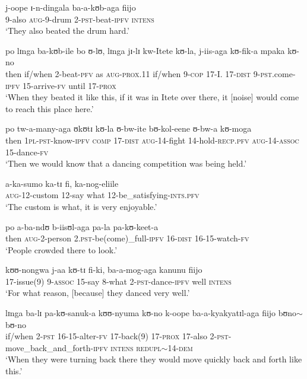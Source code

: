 \begin{exe}
\ex \gll j-oope ɪ-n-dingala ba-a-kʊb-aga fiijo\\
9-also \textsc{aug}-9-drum 2-\textsc{pst}-beat-\textsc{ipfv} \textsc{intens}\\
\glt \lq They also beated the drum hard.'

\ex \gll po lɪnga ba-kʊb-ile bo ʊ-lʊ, lɪnga jɪ-lɪ kw-Itete kʊ-la, j-iis-aga kʊ-fik-a mpaka kʊ-no\\
then if/when 2-beat-\textsc{pfv} as \textsc{aug}-\textsc{prox.11} if/when 9-\textsc{cop} 17-I. 17-\textsc{dist} 9-\textsc{pst}.come-\textsc{ipfv} 15-arrive-\textsc{fv} until 17-\textsc{prox}\\
\glt \lq When they beated it like this, if it was in Itete over there, it [noise] would come to reach this place here.'

\ex \gll po tw-a-many-aga ʊkʊtɪ kʊ-la ʊ-bw-ite bʊ-kol-eene ʊ-bw-a kʊ-moga\\
then \textsc{1pl}-\textsc{pst}-know-\textsc{ipfv} \textsc{comp} 17-\textsc{dist} \textsc{aug}-14-fight 14-hold-\textsc{recp.pfv} \textsc{aug}-14-\textsc{assoc} 15-dance-\textsc{fv}\\
\glt \lq Then we would know that a dancing competition was being held.'

\ex \gll a-ka-sumo ka-tɪ fi, ka-nog-eliile\\
\textsc{aug}-12-custom 12-say what 12-be\_satisfying-\textsc{ints.pfv}\\
\glt \lq The custom is what, it is very enjoyable.'

\ex \gll po a-ba-ndʊ b-iisʊl-aga pa-la pa-kʊ-keet-a\\
then \textsc{aug}-2-person 2.\textsc{pst}-be(come)\_full-\textsc{ipfv} 16-\textsc{dist} 16-15-watch-\textsc{fv}\\
\glt \lq People crowded there to look.'

\ex \gll kʊʊ-nongwa j-aa kʊ-tɪ fi-ki, ba-a-mog-aga kanunu fiijo\\
17-issue(9) 9-\textsc{assoc} 15-say 8-what 2-\textsc{pst}-dance-\textsc{ipfv} well \textsc{intens}\\
\glt \lq For what reason, [because] they danced very well.'

\ex \gll lɪnga ba-lɪ pa-kʊ-sanuk-a kʊʊ-nyuma kʊ-no k-oope ba-a-kyakyatɪl-aga fiijo bʊno$\sim$bʊ-no\\
if/when 2-\textsc{pst} 16-15-alter-\textsc{fv} 17-back(9) 17-\textsc{prox} 17-also 2-\textsc{pst}-move\_back\_and\_forth-\textsc{ipfv} \textsc{intens} \textsc{redupl}$\sim$14-\textsc{dem}\\
\glt \lq When they were turning back there they would move quickly back and forth like this.'


\end{exe}
